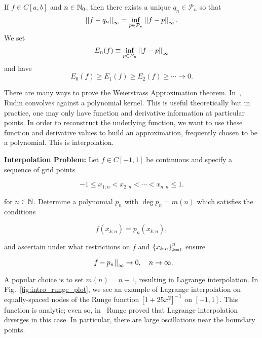 \clearpage

\begin{thm}
If $f\in C[a,b]$ and $n\in\mathbb{N}_{0}$, then there exists
a unique $q_{n}\in\mathcal{P}_{n}$ so that
%
\begin{equation}
    \left| \left| f-q_{n} \right| \right|_{\infty} = \inf_{p\in\mathcal{P}_{n}}\left| \left| f-p \right| \right|_{\infty}.
\end{equation}
%
We set
%
\begin{equation}
    E_{n}(f) \equiv \inf_{p\in\mathcal{P}_{n}}\left| \left| f-p \right| \right|_{\infty}
\end{equation}
%
and have
%
\begin{equation}
    E_{0}(f)\ge E_{1}(f)\ge E_{2}(f) \ge \cdots \to 0.
\end{equation}
\end{thm}

There are many ways to prove the Weierstrass Approximation theorem.
In~\cite[Chapter 7]{baby_rudin}, Rudin convolves against a polynomial kernel.
This is useful theoretically but in practice, one may only
have function and derivative information at particular points.
In order to reconstruct the underlying function, we want to use
these function and derivative values to build an approximation,
frequently chosen to be a polynomial.
This is interpolation.

\textbf{Interpolation Problem:} Let $f\in C[-1,1]$ be continuous
and specify a sequence of grid points

\begin{equation}
    -1\le x_{1;n} < x_{2;n} < \cdots < x_{n;n}\le1.
\end{equation}

\noindent
for $n\in\mathbb{N}$.
Determine a polynomial $p_{n}$ with $\deg p_{n} = m(n)$
which satisfies the conditions

\begin{equation}
    f(x_{k;n}) = p_{n}(x_{k;n}),
\end{equation}

\noindent
and ascertain under what restrictions on $f$ and $\left\{ x_{k;n} \right\}_{k=1}^{n}$
ensure

\begin{equation}
    \left| \left| f-p_{n} \right| \right|_{\infty} \to0,\quad n\to\infty.
\end{equation}

A popular choice is to set $m(n) = n-1$, resulting in Lagrange
interpolation.
In Fig.~\ref{fig:intro_runge_plot}, we see an example of Lagrange
interpolation on equally-spaced nodes of the Runge function
$\left[ 1+25x^{2} \right]^{-1}$ on $[-1,1]$.
This function is analytic; even so, in~\cite{runge1901} Runge
proved that Lagrange interpolation diverges in this case.
In particular, there are large oscillations near the boundary points.

